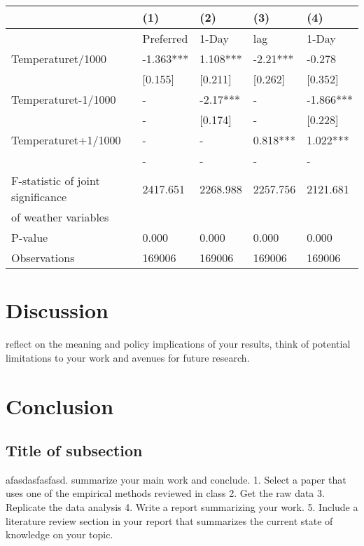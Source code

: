 \documentclass[11pt]{article}
\begin{document}
	\begin{tabular}{lllll}
		\toprule
		{} &        (1) &       (2) &       (3) &        (4) \\
		\midrule
		&  Preferred &     1-Day &       lag &      1-Day \\
		Temperaturet/1000                 &  -1.363*** &  1.108*** &  -2.21*** &     -0.278 \\
		&    [0.155] &   [0.211] &   [0.262] &    [0.352] \\
		Temperaturet-1/1000               &          - &  -2.17*** &         - &  -1.866*** \\
		&          - &   [0.174] &         - &    [0.228] \\
		Temperaturet+1/1000               &          - &         - &  0.818*** &   1.022*** \\
		&          - &         - &         - &          - \\
		F-statistic of joint significance &   2417.651 &  2268.988 &  2257.756 &   2121.681 \\
		of weather variables              &            &           &           &            \\
		P-value                           &      0.000 &     0.000 &     0.000 &      0.000 \\
		\midrule
		Observations                      &     169006 &    169006 &    169006 &     169006 \\
		\bottomrule
	\end{tabular}
	
	
	\section{Discussion}
	reflect on the meaning and policy implications of your results, think of potential
	limitations to your work and avenues for future research.
	\section{ Conclusion}
	\subsection{Title of subsection}
	afasdasfasfasd.
	summarize your main work and conclude.
	1. Select a paper that uses one of the empirical methods reviewed in class
	2. Get the raw data
	3. Replicate the data analysis
	4. Write a report summarizing your work.
	5. Include a literature review section in your report that summarizes the current state
	of knowledge on your topic.
	
\end{document}
